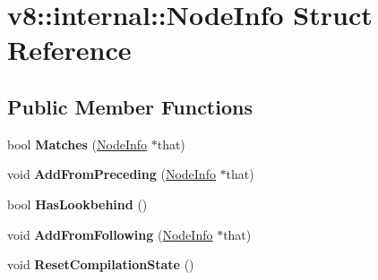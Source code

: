 \hypertarget{structv8_1_1internal_1_1_node_info}{}\section{v8\+:\+:internal\+:\+:Node\+Info Struct Reference}
\label{structv8_1_1internal_1_1_node_info}
\subsection*{Public Member Functions}
\begin{DoxyCompactItemize}
\item 
\hypertarget{structv8_1_1internal_1_1_node_info_af4bd1340f0fdd6223ad65b0a9ed00ebe}{}bool {\bfseries Matches} (\hyperlink{structv8_1_1internal_1_1_node_info}{Node\+Info} $\ast$that)\label{structv8_1_1internal_1_1_node_info_af4bd1340f0fdd6223ad65b0a9ed00ebe}

\item 
\hypertarget{structv8_1_1internal_1_1_node_info_ae61bab54bf13eb31bd647c6e3a361a58}{}void {\bfseries Add\+From\+Preceding} (\hyperlink{structv8_1_1internal_1_1_node_info}{Node\+Info} $\ast$that)\label{structv8_1_1internal_1_1_node_info_ae61bab54bf13eb31bd647c6e3a361a58}

\item 
\hypertarget{structv8_1_1internal_1_1_node_info_a38e5726083c41a3b94f336e9c003da02}{}bool {\bfseries Has\+Lookbehind} ()\label{structv8_1_1internal_1_1_node_info_a38e5726083c41a3b94f336e9c003da02}

\item 
\hypertarget{structv8_1_1internal_1_1_node_info_a074b23d256b33ea95eb8b33332a357b6}{}void {\bfseries Add\+From\+Following} (\hyperlink{structv8_1_1internal_1_1_node_info}{Node\+Info} $\ast$that)\label{structv8_1_1internal_1_1_node_info_a074b23d256b33ea95eb8b33332a357b6}

\item 
\hypertarget{structv8_1_1internal_1_1_node_info_a9de3bfee1c5a9f3628a1e982ba55c1ce}{}void {\bfseries Reset\+Compilation\+State} ()\label{structv8_1_1internal_1_1_node_info_a9de3bfee1c5a9f3628a1e982ba55c1ce}

\end{DoxyCompactItemize}
